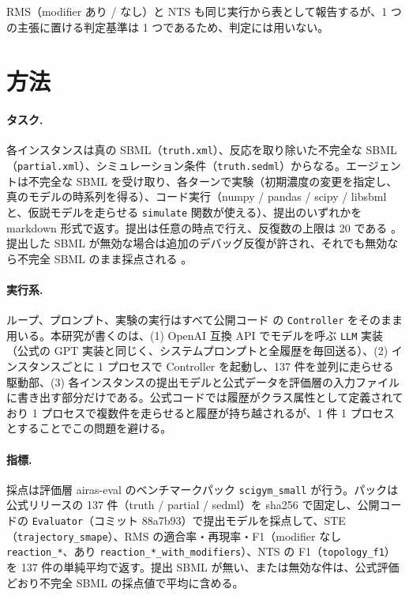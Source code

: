 \documentclass{article}
\begin{document}
RMS（modifier あり / なし）と NTS も同じ実行から表として報告するが、1 つの主張に置ける判定基準は 1 つであるため、判定には用いない。

\section{方法}
\label{sec:method}
\paragraph{タスク.}
各インスタンスは真の SBML（\texttt{truth.xml}）、反応を取り除いた不完全な SBML（\texttt{partial.xml}）、シミュレーション条件（\texttt{truth.sedml}）からなる。エージェントは不完全な SBML を受け取り、各ターンで実験（初期濃度の変更を指定し、真のモデルの時系列を得る）、コード実行（numpy / pandas / scipy / libsbml と、仮説モデルを走らせる \texttt{simulate} 関数が使える）、提出のいずれかを markdown 形式で返す。提出は任意の時点で行え、反復数の上限は 20 である \cite[s1.p3]{duan-2025-measuring}。提出した SBML が無効な場合は追加のデバッグ反復が許され、それでも無効なら不完全 SBML のまま採点される \cite[s1.p4]{duan-2025-measuring}。

\paragraph{実行系.}
ループ、プロンプト、実験の実行はすべて公開コード \citep{h4duan-2025-scigym} の \texttt{Controller} をそのまま用いる。本研究が書くのは、(1) OpenAI 互換 API でモデルを呼ぶ \texttt{LLM} 実装（公式の GPT 実装と同じく、システムプロンプトと全履歴を毎回送る）、(2) インスタンスごとに 1 プロセスで Controller を起動し、137 件を並列に走らせる駆動部、(3) 各インスタンスの提出モデルと公式データを評価層の入力ファイルに書き出す部分だけである。公式コードでは履歴がクラス属性として定義されており 1 プロセスで複数件を走らせると履歴が持ち越されるが、1 件 1 プロセスとすることでこの問題を避ける。

\paragraph{指標.}
採点は評価層 airas-eval のベンチマークパック \texttt{scigym\_small} が行う。パックは公式リリースの 137 件（truth / partial / sedml）を sha256 で固定し、公開コードの \texttt{Evaluator}（コミット 88a7b93）で提出モデルを採点して、STE（\texttt{trajectory\_smape}）、RMS の適合率・再現率・F1（modifier なし \texttt{reaction\_*}、あり \texttt{reaction\_*\_with\_modifiers}）、NTS の F1（\texttt{topology\_f1}）を 137 件の単純平均で返す。提出 SBML が無い、または無効な件は、公式評価どおり不完全 SBML の採点値で平均に含める。
\end{document}
